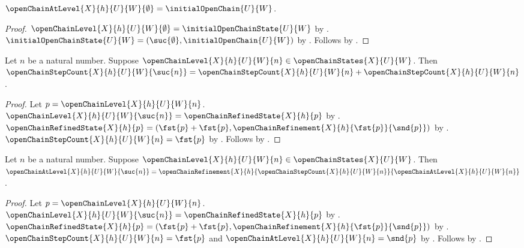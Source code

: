 \begin{corollary}\label{open_chain_at_level_zero}
    $\openChainAtLevel{X}{h}{U}{W}{\emptyset}
        =\initialOpenChain{U}{W}$.
\end{corollary}
\begin{proof}
    $\openChainLevel{X}{h}{U}{W}{\emptyset}
        =\initialOpenChainState{U}{W}$
        by .
    $\initialOpenChainState{U}{W}
        =(\suc{\emptyset},\initialOpenChain{U}{W})$
        by .
    Follows by .
\end{proof}

\begin{corollary}\label{open_chain_step_count_successor}
    Let $n$ be a natural number.
    Suppose $\openChainLevel{X}{h}{U}{W}{n}
        \in\openChainStates{X}{U}{W}$.
    Then $\openChainStepCount{X}{h}{U}{W}{\suc{n}}
        =\openChainStepCount{X}{h}{U}{W}{n}
            +\openChainStepCount{X}{h}{U}{W}{n}$.
\end{corollary}
\begin{proof}
    Let $p=\openChainLevel{X}{h}{U}{W}{n}$.
    $\openChainLevel{X}{h}{U}{W}{\suc{n}}
        =\openChainRefinedState{X}{h}{p}$
        by .
    $\openChainRefinedState{X}{h}{p}
        =(\fst{p}+\fst{p},
            \openChainRefinement{X}{h}{\fst{p}}{\snd{p}})$
        by .
    $\openChainStepCount{X}{h}{U}{W}{n}=\fst{p}$
        by .
    Follows by .
\end{proof}

\begin{corollary}\label{open_chain_at_level_successor}
    Let $n$ be a natural number.
    Suppose $\openChainLevel{X}{h}{U}{W}{n}
        \in\openChainStates{X}{U}{W}$.
    Then $\openChainAtLevel{X}{h}{U}{W}{\suc{n}}
        =\openChainRefinement{X}{h}
            {\openChainStepCount{X}{h}{U}{W}{n}}
            {\openChainAtLevel{X}{h}{U}{W}{n}}$.
\end{corollary}
\begin{proof}
    Let $p=\openChainLevel{X}{h}{U}{W}{n}$.
    $\openChainLevel{X}{h}{U}{W}{\suc{n}}
        =\openChainRefinedState{X}{h}{p}$
        by .
    $\openChainRefinedState{X}{h}{p}
        =(\fst{p}+\fst{p},
            \openChainRefinement{X}{h}{\fst{p}}{\snd{p}})$
        by .
    $\openChainStepCount{X}{h}{U}{W}{n}=\fst{p}$ and
        $\openChainAtLevel{X}{h}{U}{W}{n}=\snd{p}$
        by .
    Follows by .
\end{proof}

